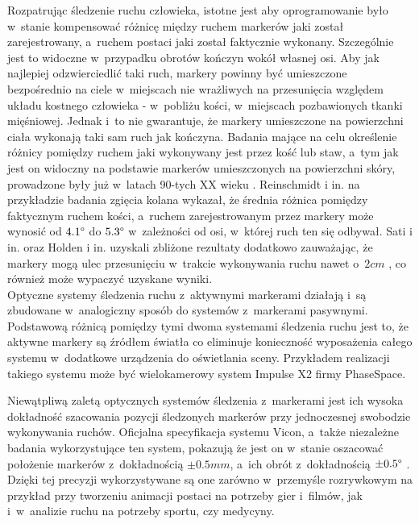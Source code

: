 Rozpatrując śledzenie ruchu człowieka, istotne jest aby oprogramowanie było w~stanie kompensować różnicę między ruchem markerów jaki został zarejestrowany, a~ruchem postaci jaki został faktycznie wykonany. Szczególnie jest to widoczne w~przypadku obrotów kończyn wokół własnej osi. Aby jak najlepiej odzwierciedlić taki ruch, markery powinny być umieszczone bezpośrednio na ciele w~miejscach nie wrażliwych na przesunięcia względem układu kostnego człowieka - w~pobliżu kości, w~miejscach pozbawionych tkanki mięśniowej. Jednak i~to nie gwarantuje, że markery umieszczone na powierzchni ciała wykonają taki sam ruch jak kończyna. Badania mające na celu określenie różnicy pomiędzy ruchem jaki wykonywany jest przez kość lub staw, a~tym jak jest on widoczny na podstawie markerów umieszczonych na powierzchni skóry, prowadzone były już w~latach 90-tych XX wieku \cite{Sati2016,Reinschmidt2016,Holden2016}. Reinschmidt i in. \cite{Reinschmidt2016} na przykładzie badania zgięcia kolana wykazał, że średnia różnica pomiędzy faktycznym ruchem kości, a~ruchem zarejestrowanym przez markery może wynosić od $4.1\degree$ do $5.3\degree$ w~zależności od osi, w~której ruch ten się odbywał. Sati i in. \cite{Sati2016} oraz Holden i in. \cite{Holden2016} uzyskali zbliżone rezultaty dodatkowo zauważając, że markery mogą ulec przesunięciu w~trakcie wykonywania ruchu nawet o~$2cm$ \cite{Sati2016}, co również może wypaczyć uzyskane wyniki.\\ 
			
Optyczne systemy śledzenia ruchu z~aktywnymi markerami działają i~są zbudowane w~analogiczny sposób do systemów z~markerami pasywnymi. Podstawową różnicą pomiędzy tymi dwoma systemami śledzenia ruchu jest to, że aktywne markery są źródłem światła co eliminuje konieczność wyposażenia całego systemu w~dodatkowe urządzenia do oświetlania sceny. Przykładem realizacji takiego systemu może być wielokamerowy system Impulse X2 firmy PhaseSpace.
			
Niewątpliwą zaletą optycznych systemów śledzenia z~markerami jest ich wysoka dokładność szacowania pozycji śledzonych markerów przy jednoczesnej swobodzie wykonywania ruchów. Oficjalna specyfikacja systemu Vicon, a~także niezależne badania wykorzystujące ten system, pokazują że jest on w~stanie oszacować położenie markerów z~dokładnością $\pm0.5mm$, a~ich obrót z~dokładnością $\pm0.5 \degree$ \cite{Windolf2008}. Dzięki tej precyzji wykorzystywane są one zarówno w~przemyśle rozrywkowym na przykład przy tworzeniu animacji postaci na potrzeby gier i~filmów, jak i~w~analizie ruchu na potrzeby sportu, czy medycyny. 
			
